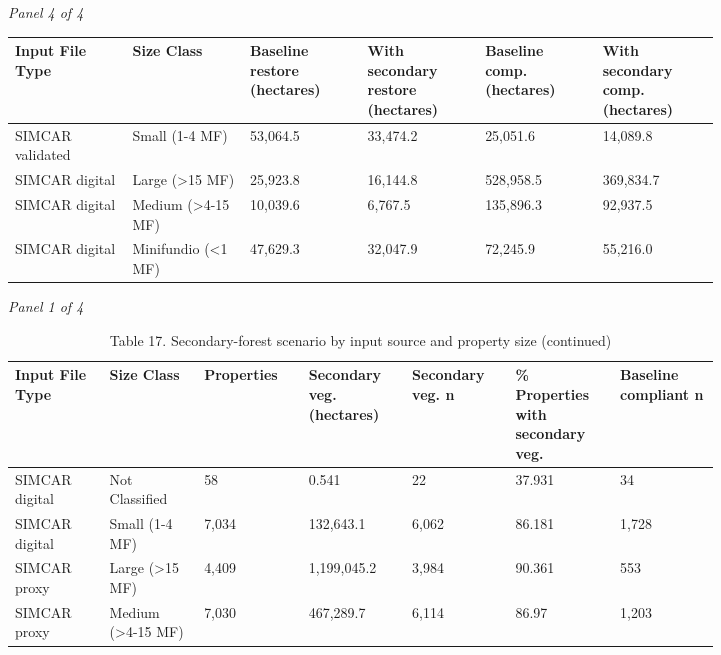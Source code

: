 \documentclass[12pt]{article}
\begin{document}
\begin{landscape}
\begin{table}[H]
\textit{Panel 4 of 4}\\[2pt]
{\fontsize{12}{14}\selectfont
\setlength{\tabcolsep}{3pt}
\renewcommand{\arraystretch}{1.08}
\begin{tabular}{p{0.137\linewidth}p{0.137\linewidth}p{0.137\linewidth}p{0.137\linewidth}p{0.137\linewidth}p{0.137\linewidth}}
\toprule
Input File Type & Size Class & Baseline restore (hectares) & With secondary restore (hectares) & Baseline comp. (hectares) & With secondary comp. (hectares) \\
\midrule
SIMCAR validated & Small (1-4 MF) & 53,064.5 & 33,474.2 & 25,051.6 & 14,089.8 \\
SIMCAR digital & Large (>15 MF) & 25,923.8 & 16,144.8 & 528,958.5 & 369,834.7 \\
SIMCAR digital & Medium (>4-15 MF) & 10,039.6 & 6,767.5 & 135,896.3 & 92,937.5 \\
SIMCAR digital & Minifundio (<1 MF) & 47,629.3 & 32,047.9 & 72,245.9 & 55,216.0 \\
\bottomrule
\end{tabular}
}
\end{table}
\begin{table}[H]
\centering
\caption{Table 17. Secondary-forest scenario by input source and property size (continued)}
\textit{Panel 1 of 4}\\[2pt]
{\fontsize{12}{14}\selectfont
\setlength{\tabcolsep}{3pt}
\renewcommand{\arraystretch}{1.08}
\begin{tabular}{p{0.117\linewidth}p{0.117\linewidth}p{0.117\linewidth}p{0.117\linewidth}p{0.117\linewidth}p{0.117\linewidth}p{0.117\linewidth}}
\toprule
Input File Type & Size Class & Properties & Secondary veg. (hectares) & Secondary veg. n & \% Properties with secondary veg. & Baseline compliant n \\
\midrule
SIMCAR digital & Not Classified & 58 & 0.541 & 22 & 37.931 & 34 \\
SIMCAR digital & Small (1-4 MF) & 7,034 & 132,643.1 & 6,062 & 86.181 & 1,728 \\
SIMCAR proxy & Large (>15 MF) & 4,409 & 1,199,045.2 & 3,984 & 90.361 & 553 \\
SIMCAR proxy & Medium (>4-15 MF) & 7,030 & 467,289.7 & 6,114 & 86.97 & 1,203 \\
\bottomrule
\end{tabular}
}

\vspace{0.6em}


\end{table}
\end{landscape}
\end{document}
